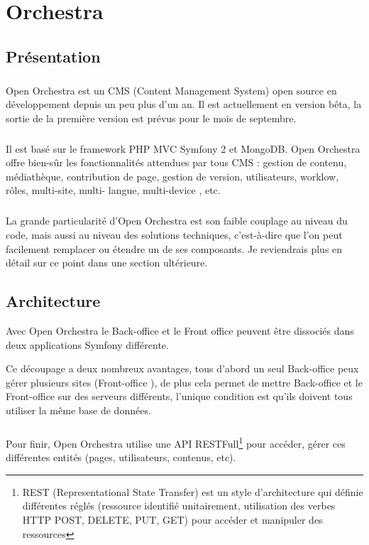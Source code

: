 \chapter{Orchestra}
\section{Présentation}
        \paragraph{}
        Open Orchestra est un CMS (Content Management  System) open source en développement depuis un peu plus d'un an. Il est actuellement en version bêta, la sortie de la première version est prévus pour le mois de septembre.
        \paragraph{}
        Il est basé sur le framework PHP MVC Symfony 2 et MongoDB. Open Orchestra offre bien-sûr les fonctionnalités attendues par tous CMS : gestion de contenu, médiathèque, contribution de page, gestion de version, utilisateurs, worklow, rôles,  multi-site, multi- langue,  multi-device , etc.
        \paragraph{}
        La grande particularité d'Open Orchestra est son faible couplage au niveau du code, mais aussi au niveau des solutions techniques, c'est-à-dire que l'on peut facilement remplacer ou étendre un de ses composants. Je reviendrais plus en détail sur ce point dans une section ultérieure.
        
        \section{Architecture}
       Avec Open Orchestra le \og Back-office \fg{} et le \og Front office \fg{} peuvent être dissociés dans deux applications Symfony différente. 

        Ce découpage a deux nombreux avantages, tous d'abord un seul \og Back-office \fg{}  peux gérer plusieurs sites (\og Front-office \fg{}), de plus cela permet de mettre \og Back-office \fg{} et le \og Front-office \fg{} sur des serveurs différents, l'unique condition est qu'ils doivent tous utiliser la même base de données.
        \paragraph{}
		Pour finir, Open Orchestra utilise une API RESTFull\footnote{REST (Representational State Transfer) est un style d'architecture qui définie différentes réglés (ressource identifié unitairement, utilisation des verbes HTTP POST, DELETE, PUT, GET) pour accéder et manipuler des ressources } pour  accéder, gérer ces différentes entités (pages, utilisateurs, contenus, etc).
